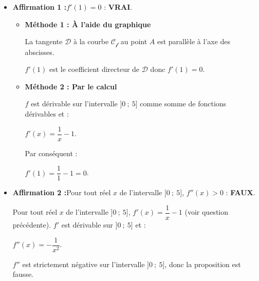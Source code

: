 \begin{corrige}
     \begin{itemize}
          \item %
          \textbf{Affirmation 1 :}\quad $f'(1)=0$ : \textbf{VRAI}.
          \par
          \begin{itemize}
               \item
               \textbf{Méthode 1 : \`A l'aide du graphique}
               \par
               La tangente $\mathscr{D}$ à la courbe $\mathscr{C_f}$ au point $A$ est parallèle à l'axe des abscisses.
               \par
               $f'(1)$ est le coefficient directeur de $\mathscr{D}$ donc $f'(1)=0$.
               \par
               \vspace{0.5cm}
               \item
               \textbf{Méthode 2 : Par le calcul}
               \par
               $f$ est dérivable sur l'intervalle $]0~;~5]$ comme somme de fonctions dérivables et :
               \par
               $f'(x)=\dfrac{1}{x}-1$.
               \par
               Par conséquent :
               \par
               $f'(1)=\dfrac{1}{1}-1=0$.
               \par
          \end{itemize}
          \item %
          \textbf{Affirmation 2 :}\quad Pour tout réel $x$ de l'intervalle $]0~;~5]$, $f''(x)>0$ : \textbf{FAUX}.
          \par
          Pour tout réel $x$ de l'intervalle $]0~;~5]$, $f'(x)=\dfrac{1}{x}-1$ (voir question précédente). $f'$ est dérivable sur $]0~;~5]$ et :
          \par
          $f''(x)=-\dfrac{1}{x^2}.$
          \par
          $f''$ est strictement négative sur l'intervalle $]0~;~5]$, donc la proposition est fausse.

\end{itemize}
\end{corrige}
